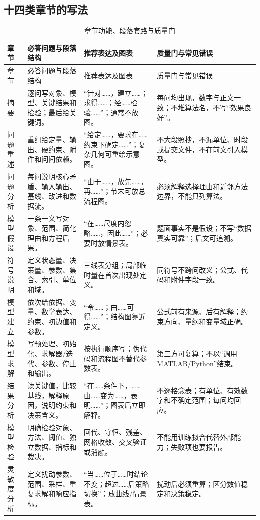 \subsection{十四类章节的写法}

\begin{longtable}{p{1.8cm}p{4.2cm}p{4.0cm}p{4.0cm}}
\caption{章节功能、段落套路与质量门}\label{tab:sections}\\
\toprule
章节 & 必答问题与段落结构 & 推荐表达及图表 & 质量门与常见错误\\
\midrule
\endfirsthead
\toprule
章节 & 必答问题与段落结构 & 推荐表达及图表 & 质量门与常见错误\\
\midrule
\endhead
摘要 & 逐问写对象、模型、关键结果和检验；最后给关键词。 & “针对……，建立……；求得……；经……检验……”；通常不放图。 & 每问均出现，数字与正文一致；不堆算法名，不写“效果良好”。\\
问题重述 & 重组给定量、输出、硬约束、附件和问间依赖。 & “给定……，要求在……约束下确定……”；复杂几何可重绘示意图。 & 不大段照抄，不漏单位、时段或提交文件，不在前文引入模型。\\
问题分析 & 每问说明核心矛盾、输入输出、基线、改进和数据流。 & “由于……，故先……，再……”；节末可放总流程图。 & 必须解释选择理由和近邻方法边界，不能只列算法。\\
模型假设 & 一条一义写对象、范围、简化理由和方程后果。 & “在……尺度内忽略……，因此……”；必要时放情景表。 & 题面事实不是假设；不写“数据真实可靠”；后文可追溯。\\
符号说明 & 定义状态量、决策量、参数、集合、索引、单位和域。 & 三线表分组；局部临时量在首次出现处定义。 & 同符号不跨问改义；公式、代码和附件字段一致。\\
模型建立 & 依次给依据、变量、数学表达、约束、初边值和参数。 & “令……；由……可得……”；结构图靠近定义。 & 公式前有来源、后有解释；约束方向、量纲和变量域正确。\\
模型求解 & 写预处理、初始化、求解器/迭代、参数、停止和输出。 & 按执行顺序写；伪代码和流程图不替代参数表。 & 第三方可复算；不以“调用 MATLAB/Python”结束。\\
结果分析 & 读关键值，比较基线，解释原因，说明约束和决策含义。 & “在……条件下，……由……变为……，表明……”；图表后立即解释。 & 不逐格念表；有单位、有效数字和不确定范围；每问均回应。\\
模型检验 & 明确检验对象、方法、阈值、独立数据、指标和裁决。 & 回代、守恒、残差、网格收敛、交叉验证或消融。 & 不能用训练拟合代替外部能力；失败项也要报告。\\
灵敏度分析 & 定义扰动参数、范围、采样、重复求解和响应指标。 & “当……位于……时结论不变；超过……后策略切换”；放曲线/情景表。 & 扰动后必须重算；区分数值稳定和决策稳定。\\

\end{longtable}

